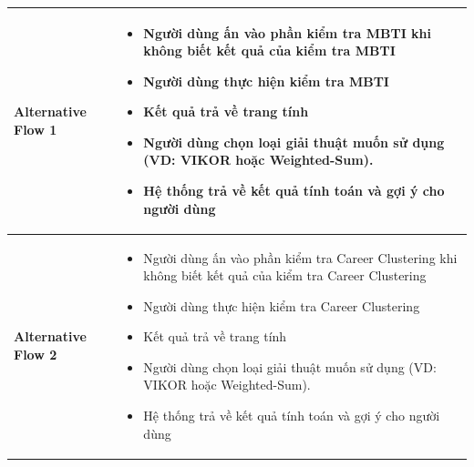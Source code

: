\begin{longtable}[H]{|l|p{}|}
        \hline
        
        \textbf{Alternative Flow 1} &  \vspace{-0.75cm} \begin{itemize}[leftmargin=4mm]
            \setlength\itemsep{0em}
            \item Người dùng ấn vào phần kiểm tra MBTI khi không biết kết quả của kiểm tra MBTI
            \item Người dùng thực hiện kiểm tra MBTI
            \item Kết quả trả về trang tính
            \item Người dùng chọn loại giải thuật muốn sử dụng (VD: VIKOR hoặc Weighted-Sum). 
            \item Hệ thống trả về kết quả tính toán và gợi ý cho người dùng
        \end{itemize} \\
        
        \hline
        
        \textbf{Alternative Flow 2} & \vspace{-0.75cm} \begin{itemize}[leftmargin=4mm]
            \setlength\itemsep{0em}
            \item Người dùng ấn vào phần kiểm tra Career Clustering 
            khi không biết kết quả của kiểm tra Career Clustering
            \item Người dùng thực hiện kiểm tra Career Clustering
            \item Kết quả trả về trang tính
            \item Người dùng chọn loại giải thuật muốn sử dụng (VD: VIKOR hoặc Weighted-Sum). 
            \item Hệ thống trả về kết quả tính toán và gợi ý cho người dùng
        \end{itemize} \\

        \hline 
        

\end{longtable}
